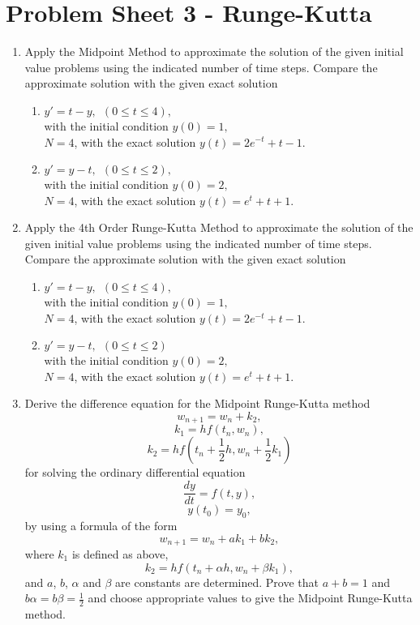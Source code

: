 \section{Problem Sheet 3 - Runge-Kutta}
\begin{enumerate}


\item
Apply the Midpoint Method to approximate the solution of the given initial value problems using the indicated number of time steps. Compare the approximate solution with the given exact solution
\begin{enumerate}
\item
$y'=t-y, \ \ (0\leq t \leq 4),$\\
with the initial condition $y(0)=1,$\\
$N=4$, 
with the exact solution
$y(t)=2e^{-t}+t-1.$\\

\item 
$y'=y-t, \ \ (0\leq t \leq 2),$\\
with the initial condition $y(0)=2,$\\
$N=4$, 
with the exact solution
$y(t)=e^{t}+t+1.$\\

\end{enumerate}
\item
Apply the 4th Order Runge-Kutta Method to approximate the solution of the given initial value problems using the indicated number of time steps. Compare the approximate solution with the given exact solution
\begin{enumerate}
\item
$y'=t-y, \ \ (0\leq t \leq 4),$\\
with the initial condition $y(0)=1,$\\
$N=4$, 
with the exact solution
$y(t)=2e^{-t}+t-1.$\\

\item 
$y'=y-t, \ \ (0\leq t \leq 2)$\\
with the initial condition $y(0)=2,$\\
$N=4$, with the exact solution
$y(t)=e^{t}+t+1.$\\

\end{enumerate}
\item
Derive the difference equation for the Midpoint Runge-Kutta method\\
\[ w_{n+1}=w_n+k_2,\]
\[k_1=hf(t_n,w_n),\]
\[k_2=hf(t_n+\frac{1}{2}h,w_n+\frac{1}{2}k_1)\]
for solving the ordinary differential equation
\[ \frac{dy}{dt}=f(t,y), \]
\[y(t_0)=y_0, \]
by using a formula of the form
\[w_{n+1}=w_n+ak_1+bk_2, \]
where $k_1$ is defined as above,
\[k_2=hf(t_n+\alpha h,w_n+\beta k_1),\]
and $a$, $b$, $\alpha$ and $\beta$ are constants are determined. Prove that $a+b=1$ and $b\alpha=b\beta=\frac{1}{2}$ and choose appropriate values to give the Midpoint Runge-Kutta method.


\end{enumerate}
\newpage